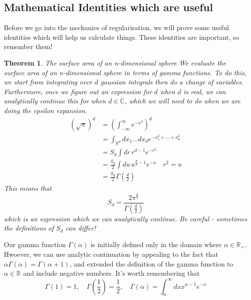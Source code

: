 \documentclass[11pt, oneside]{article}   	%
\theoremstyle{slanted}
\newtheorem*{thm}{Theorem}
\begin{document}
\subsection{Mathematical Identities which are useful}
Before we go into the mechanics 
of regularisation, we will prove some useful
identities which will help us 
calculate things. These identities are important, 
so remember them!

\begin{thm}{The surface area of an n-dimensional sphere}
We evaluate the surface 
area of an n-dimensional sphere in 
terms of gamma functions. To do this, we 
start from integrating over $ d $ gaussian integrals 
then do a change of variables.
Furthermore, once we 
figure out an expression for $ d $ when $ d $ is real, 
we can analytically continue this for when $ d \in \mathbb{ C } $, 
which we will need to do when we are doing 
the epsilon expansion. 
\begin{align*}
\left( \sqrt{ \pi }   \right)  ^{ d } 
&=  \left( \int_{ - \infty } ^{ \infty } e ^{ - x ^ 2 }   \right) ^{ d }  \\
&=  \int _{ \mathbb{ R } ^{ d  } } dx _ 1 \dots dx _ d 
e ^{  - x_1 ^ 2 + \dots + x_ d ^ 2 } \\ 
&=  S_ d \int d r \, r ^{ d - 1 } e ^{ - r ^ 2  } \\
&=  \frac{S _ d }{  2 } \int du \, u ^{ \frac{d}{2 }  - 1 } e^{ - u  } 
\quad r ^ 2  =u  \\
&=  \frac{S _ d }{  2 } \Gamma \left( \frac{d}{2 }  \right) 
\end{align*}
This means that 
\[
S _ d  = \frac{2 \pi ^{ \frac{d}{2 } } }{ \Gamma \left( \frac{d}{2 }  \right)  }
\] which is 
an expression which we can analytically continue. 
Be careful - sometimes the definitions of $ S _ d $ can differ!
\end{thm}

Our gamma function $ \Gamma \left( \alpha  \right) $ is initially defined 
only in the domain where $ \alpha \in \mathbb{ R } _ +  $. 
Hwoever, we can use analytic continuation by 
appealing to the fact that 
$ \alpha \Gamma \left( \alpha  \right)   = \Gamma \left( \alpha + 1  \right)  $,
and extended the definition of the gamma function 
to $ \alpha \in \mathbb{ R }  $ and include negative numbers. 
It's worth remembering that 
\[
\Gamma \left( 1  \right)   = 1 , \quad \Gamma \left( \frac{1}{2} \right)  = 
\frac{1}{2 } , \quad \Gamma \left( \alpha \right)  
 = \int _ 0 ^{ \infty } dx x ^{ \alpha  -1 } e ^{ - x }
\]
\end{document}
